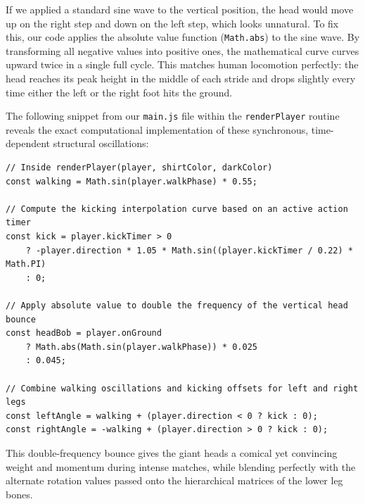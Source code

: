 If we applied a standard sine wave to the vertical position, the head would move up on the right step and down on the left step, which looks unnatural. To fix this, our code applies the absolute value function (\texttt{Math.abs}) to the sine wave. By transforming all negative values into positive ones, the mathematical curve curves upward twice in a single full cycle. This matches human locomotion perfectly: the head reaches its peak height in the middle of each stride and drops slightly every time either the left or the right foot hits the ground. 

The following snippet from our \texttt{main.js} file within the \texttt{renderPlayer} routine reveals the exact computational implementation of these synchronous, time-dependent structural oscillations:

\begin{lstlisting}[style=vscode_JS]
// Inside renderPlayer(player, shirtColor, darkColor)
const walking = Math.sin(player.walkPhase) * 0.55;

// Compute the kicking interpolation curve based on an active action timer
const kick = player.kickTimer > 0 
    ? -player.direction * 1.05 * Math.sin((player.kickTimer / 0.22) * Math.PI) 
    : 0;

// Apply absolute value to double the frequency of the vertical head bounce
const headBob = player.onGround 
    ? Math.abs(Math.sin(player.walkPhase)) * 0.025 
    : 0.045;

// Combine walking oscillations and kicking offsets for left and right legs
const leftAngle = walking + (player.direction < 0 ? kick : 0);
const rightAngle = -walking + (player.direction > 0 ? kick : 0);
\end{lstlisting}

This double-frequency bounce gives the giant heads a comical yet convincing weight and momentum during intense matches, while blending perfectly with the alternate rotation values passed onto the hierarchical matrices of the lower leg bones.